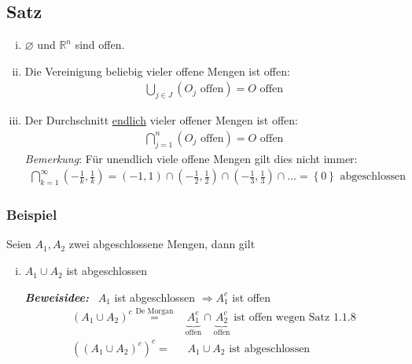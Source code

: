 \documentclass[11pt,a4paper]{book}
\newcommand {\Rn}	{\mathbb{R}^n}
\newcommand{\1}    	{\mathbbm{1}}
\newcommand{\Beweis}[1][Beweis]
{\begin{mdframed}[backgroundcolor=gray!10,linewidth=0pt]\noindent\textit{\textbf{{#1}:}}~}
\newcommand{\QED}	{\end{mdframed}}
\begin{document}
\subsection{Satz}
\begin{enumerate}[(i)]
	\item \(\varnothing\) und \(\Rn\) sind offen.
	\item Die Vereinigung beliebig vieler offene Mengen ist offen:
	\begin{align*}
		\bigcup_{j \in J} \left( O_j \textrm{ offen} \right) = O \textrm{ offen}
	\end{align*}
	\item Der Durchschnitt \underline{endlich} vieler offener Mengen ist offen:
	\begin{align*}
		\bigcap_{j = 1}^{n} \left( O_j \textrm{ offen} \right) = O \textrm{ offen}
	\end{align*}
	\textit{Bemerkung}: Für unendlich viele offene Mengen gilt dies nicht immer:
	\begin{align*}
		\bigcap_{k = 1}^{\infty} \left( -\frac{1}{k}, \frac{1}{k} \right) = \left( -1, 1 \right) \cap \left( -\frac{1}{2}, \frac{1}{2} \right) \cap \left( -\frac{1}{3}, \frac{1}{3} \right) \cap ... = \left\{ 0 \right\} \textrm{ abgeschlossen}
	\end{align*}
\end{enumerate}

\subsubsection{Beispiel}
Seien \(A_1, A_2\) zwei abgeschlossene Mengen, dann gilt
\begin{enumerate}[(i)]
	\item \(A_1 \cup A_2\) ist abgeschlossen \\
	\Beweis[Beweisidee] \(A_1\) ist abgeschlossen \(\Rightarrow A_1^c\) ist offen \\
	\begin{align*}
		\left( A_1 \cup A_2 \right)^c \stackrel{\textrm{De Morgan}}{=}& \underbrace{A_1^c}_{\textrm{offen}} \cap \underbrace{A_2^c}_{\textrm{offen}} \textrm{ ist offen wegen Satz 1.1.8} \\
		\left( \left( A_1 \cup A_2 \right)^c \right)^c =& ~A_1 \cup A_2 \textrm{ ist abgeschlossen}
	\end{align*}
	\QED
\end{enumerate}
\end{document}

